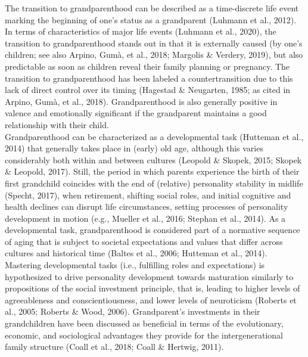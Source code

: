 \documentclass[
  english,
  man, noextraspace,floatsintext]{apa7}
\begin{document}
The transition to grandparenthood can be described as a time-discrete life event marking the beginning of one's status as a grandparent (Luhmann et al., 2012). In terms of characteristics of major life events (Luhmann et al., 2020), the transition to grandparenthood stands out in that it is externally caused (by one's children; see also Arpino, Gumà, et al., 2018; Margolis \& Verdery, 2019), but also predictable as soon as children reveal their family planning or pregnancy. The transition to grandparenthood has been labeled a countertransition due to this lack of direct control over its timing (Hagestad \& Neugarten, 1985; as cited in Arpino, Gumà, et al., 2018). Grandparenthood is also generally positive in valence and emotionally significant if the grandparent maintains a good relationship with their child.\\
Grandparenthood can be characterized as a developmental task (Hutteman et al., 2014) that generally takes place in (early) old age, although this varies considerably both within and between cultures (Leopold \& Skopek, 2015; Skopek \& Leopold, 2017). Still, the period in which parents experience the birth of their first grandchild coincides with the end of (relative) personality stability in midlife (Specht, 2017), when retirement, shifting social roles, and initial cognitive and health declines can disrupt life circumstances, setting processes of personality development in motion (e.g., Mueller et al., 2016; Stephan et al., 2014). As a developmental task, grandparenthood is considered part of a normative sequence of aging that is subject to societal expectations and values that differ across cultures and historical time (Baltes et al., 2006; Hutteman et al., 2014). Mastering developmental tasks (i.e., fulfilling roles and expectations) is hypothesized to drive personality development towards maturation similarly to propositions of the social investment principle, that is, leading to higher levels of agreeableness and conscientiousness, and lower levels of neuroticism (Roberts et al., 2005; Roberts \& Wood, 2006). Grandparent's investments in their grandchildren have been discussed as beneficial in terms of the evolutionary, economic, and sociological advantages they provide for the intergenerational family structure (Coall et al., 2018; Coall \& Hertwig, 2011).\\
\end{document}
